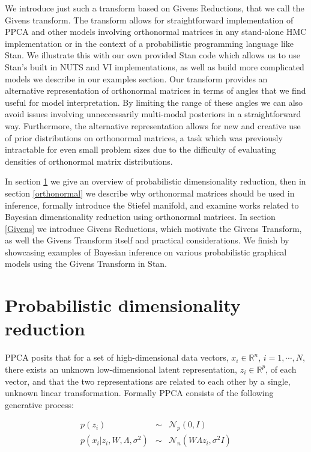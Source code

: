 \documentclass{article}
\begin{document}
We introduce just such a transform based on Givens Reductions, that we call the Givens transform. The transform allows for straightforward implementation of PPCA and other models involving orthonormal matrices in any stand-alone HMC implementation or in the context of a probabilistic programming language like Stan. We illustrate this with our own provided Stan code which allows us to use Stan's built in NUTS and VI implementations, as well as build more complicated models we describe in our examples section. Our transform provides an alternative representation of orthonormal matrices in terms of angles that we find useful for model interpretation. By limiting the range of these angles we can also avoid issues involving unneccessarily multi-modal posteriors in a straightforward way. Furthermore, the alternative representation allows for new and creative use of prior distributions on orthonormal matrices, a task which was previously intractable for even small problem sizes due to the difficulty of evaluating densities of orthonormal matrix distributions.

In section \ref{Probabilistic dimensionality reduction} we give an overview of probabilistic dimensionality reduction, then in section \ref{orthonormal} we describe why orthonormal matrices should be used in inference, formally introduce the Stiefel manifold, and examine works related to Bayesian dimensionality reduction using orthonormal matrices. In section \ref{Givens} we introduce Givens Reductions, which motivate the Givens Transform, as well the Givens Transform itself and practical considerations. We finish by showcasing examples of Bayesian inference on various probabilistic graphical models using the Givens Transform in Stan.

\section{Probabilistic dimensionality reduction} \label{Probabilistic dimensionality reduction}
PPCA posits that for a set of high-dimensional data vectors, $x_i \in \mathbb{R}^n$, $i = 1, \cdots, N$, there exists an unknown low-dimensional latent representation, $z_i \in \mathbb{R}^p$, of each vector, and that the two representations are related to each other by a single, unknown linear transformation. Formally PPCA consists of the following generative process:

\begin{eqnarray}
\label{eq:PpcaGenerativeProcess}
p(z_i) &\sim& \mathcal{N}_p(0, I) \nonumber\\
p(x_i | z_i, W, \Lambda, \sigma^2) &\sim& \mathcal{N}_n(W \Lambda z_i, \sigma^2 I)
\end{eqnarray}
\end{document}
